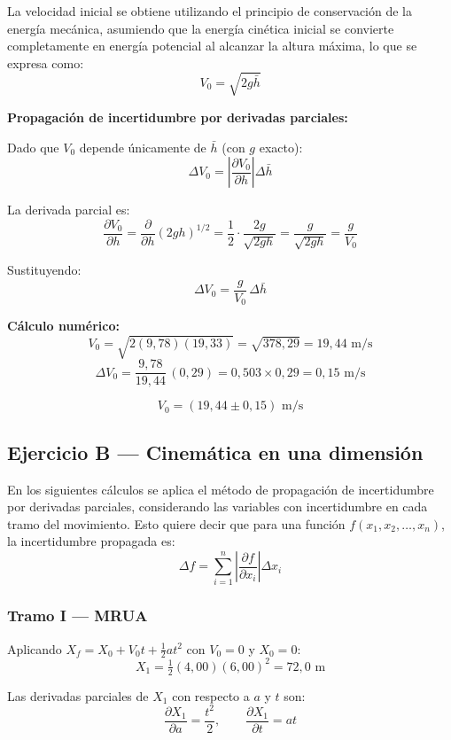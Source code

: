 La velocidad inicial se obtiene utilizando el principio 
de conservación de la energía mecánica, 
asumiendo que la energía cinética inicial se convierte completamente en 
energía potencial al alcanzar la altura máxima, lo que se expresa como:
\[
V_0 = \sqrt{2g\bar{h}}
\]

\textbf{Propagación de incertidumbre por derivadas parciales:}

Dado que $V_0$ depende únicamente de $\bar{h}$ (con $g$ exacto):
\[
\Delta V_0 = \left|\frac{\partial V_0}{\partial h}\right| \Delta\bar{h}
\]

La derivada parcial es:
\[
\frac{\partial V_0}{\partial h} = \frac{\partial}{\partial h}\left(2gh\right)^{1/2}
= \frac{1}{2}\cdot\frac{2g}{\sqrt{2gh}} = \frac{g}{\sqrt{2gh}} = \frac{g}{V_0}
\]

Sustituyendo:
\[
\Delta V_0 = \frac{g}{V_0}\,\Delta\bar{h}
\]

\textbf{Cálculo numérico:}
\[
V_0 = \sqrt{2(9{,}78)(19{,}33)} = \sqrt{378{,}29} = 19{,}44 \text{ m/s}
\]
\[
\Delta V_0 = \frac{9{,}78}{19{,}44}\,(0{,}29) = 0{,}503 \times 0{,}29 = 0{,}15 \text{ m/s}
\]

\[
\boxed{V_0 = (19{,}44 \pm 0{,}15) \text{ m/s}}
\]

\subsection*{Ejercicio B — Cinemática en una dimensión}

En los siguientes cálculos se aplica el método de propagación de incertidumbre 
por derivadas parciales, considerando las variables con incertidumbre 
en cada tramo del movimiento. Esto quiere decir que para una 
función $f(x_1, x_2, \ldots, x_n)$, la incertidumbre
propagada es:
\[
\Delta f = \sum_{i=1}^{n} \left|\frac{\partial f}{\partial x_i}\right| \Delta x_i
\]

\subsubsection*{Tramo I — MRUA}

Aplicando $X_f = X_0 + V_0 t + \frac{1}{2}at^2$ con $V_0 = 0$ y $X_0 = 0$:
\[
X_1 = \tfrac{1}{2}(4{,}00)(6{,}00)^2 = 72{,}0 \text{ m}
\]

Las derivadas parciales de $X_1$ con respecto a $a$ y $t$ son:
\[
\frac{\partial X_1}{\partial a} = \frac{t^2}{2}, \qquad
\frac{\partial X_1}{\partial t} = at
\]

